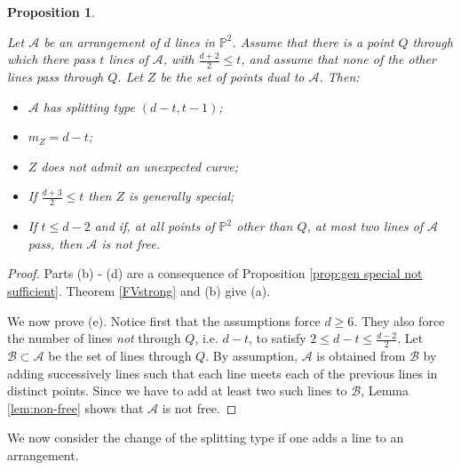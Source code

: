 \documentclass[12pt]{amsart}
\numberwithin{equation}{section}
\newtheorem{proposition}[theorem]{Proposition}
\theoremstyle{definition}
\begin{document}
\begin{proposition} \label{prop:many concurrent lines} 

Let $\mathcal A$ be an arrangement of $d$ lines in $\mathbb P^2$.  Assume that there is a point $Q$ through which there pass $t$ lines of 
$\mathcal A$, with $\frac{d+2}{2} \leq t$, and assume that none of the other lines pass through $Q$. Let $Z$ be the set of points dual to $\mathcal A$.
Then:
\begin{itemize}

\item[(a)] $\mathcal A$ has splitting type $(d-t,t-1)$;

\item[(b)]  $m_Z = d-t$;

\item[(c)] $Z$ does not admit an unexpected curve;

\item[(d)] If $\frac{d+3}{2} \leq t$ then $Z$ is generally special;

\item[(e)] If $t \leq d-2$ and if, at all  points of $\mathbb P^2$ other than $Q$, at most two lines of $\mathcal A$ pass, then $\mathcal A$ is not free.

\end{itemize}
\end{proposition}

\begin{proof}
Parts (b) - (d) are a consequence of Proposition \ref{prop:gen special not sufficient}.  Theorem \ref{FVstrong} and (b)  give (a). 

We now prove (e). 
Notice first that the assumptions force $d \geq 6$. They also force the number of lines {\em not} through 
$Q$, i.e. $d-t$, to satisfy $2 \leq d-t \leq \frac{d-2}{2}$.
Let $\mathcal B \subset \mathcal A$ be the set of lines 
through $Q$. By assumption, ${\mathcal{A}}$ is obtained from ${\mathcal{B}}$ by adding successively lines such that each line meets each of the previous lines in distinct points. Since we have to add at least two such lines to ${\mathcal{B}}$, Lemma \ref{lem:non-free} shows that ${\mathcal{A}}$ is not free. 
\end{proof} 

We now consider the change of the splitting type if one adds a line to an arrangement. 
\end{document}
